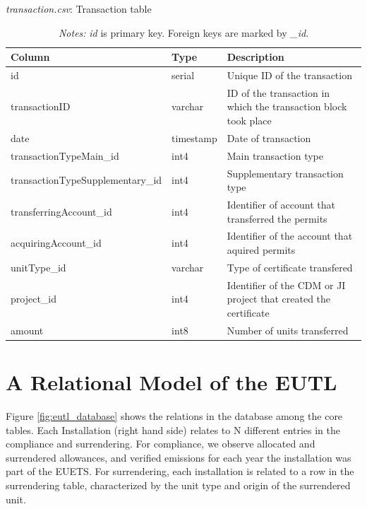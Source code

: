 \documentclass[authoryear]{elsarticle}
\begin{document}
\begin{table}[htbp]\scriptsize
	\caption{\textit{transaction.csv}: Transaction table}\label{tab:tbl_transaction}
	\centering
	\begin{tabular*}{\textwidth}{@{}@{\extracolsep{\fill}} lll @{}}
		\toprule
		\toprule
		\textbf{Column} & \textbf{Type} & \textbf{Description} \\
		\midrule
		id    & serial & Unique ID of the transaction  \\
		transactionID & varchar & ID of the transaction in which the transaction block took place \\
		date  & timestamp & Date of transaction \\
		transactionTypeMain\_id & int4  & Main transaction type \\
		transactionTypeSupplementary\_id & int4  & Supplementary transaction type \\
		transferringAccount\_id & int4  & Identifier of account that transferred the permits \\
		acquiringAccount\_id & int4  & Identifier of the account that aquired permits \\
		unitType\_id & varchar & Type of certificate transfered \\
		project\_id & int4  & Identifier of the CDM or JI project that created the certificate \\
		amount & int8  & Number of units transferred \\
		\bottomrule
		\bottomrule
	\end{tabular*}%
	\vspace{-3ex}
\caption*{\footnotesize \emph{Notes:} \textit{id} is primary key. Foreign keys are marked by \textit{\_id}.}
\vspace{0ex}
\end{table}







\section{A Relational Model of the EUTL}\label{sec:model}
Figure \ref{fig:eutl_database} shows the relations in the database among the core tables. Each Installation (right hand side) relates to N different entries in the compliance and surrendering. For compliance, we observe allocated and surrendered allowances, and verified emissions for each year the installation was part of the EUETS. For surrendering, each installation is related to a row in the surrendering table, characterized by the unit type and origin of the surrendered unit. 
	
\end{document}
